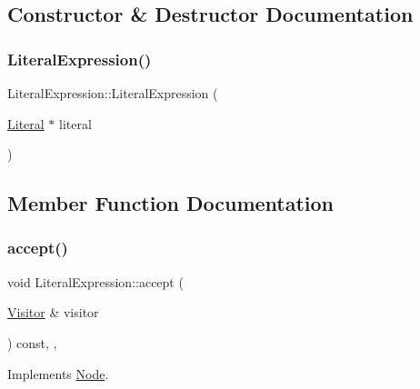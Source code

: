 \subsection{Constructor \& Destructor Documentation}
\mbox{\label{struct_literal_expression_a1675f7d7132e9b5944fa6f94789e8847}} 
\subsubsection{\texorpdfstring{Literal\+Expression()}{LiteralExpression()}}
{\footnotesize\ttfamily Literal\+Expression\+::\+Literal\+Expression (\begin{DoxyParamCaption}\item[{\hyperlink{struct_literal}{Literal} $\ast$}]{literal }\end{DoxyParamCaption})\hspace{0.3cm}{\ttfamily [inline]}}



\subsection{Member Function Documentation}
\mbox{\label{struct_literal_expression_a803968c0fd7ae048314c7812d992d995}} 
\subsubsection{\texorpdfstring{accept()}{accept()}}
{\footnotesize\ttfamily void Literal\+Expression\+::accept (\begin{DoxyParamCaption}\item[{\hyperlink{struct_visitor}{Visitor} \&}]{visitor }\end{DoxyParamCaption}) const\hspace{0.3cm}{\ttfamily [inline]}, {\ttfamily [override]}, {\ttfamily [virtual]}}



Implements \hyperlink{struct_node_a10bd7af968140bbf5fa461298a969c71}{Node}.

\mbox{\label{struct_literal_expression_a2c02bac28c4d9422580a1defa0b7506c}} 
